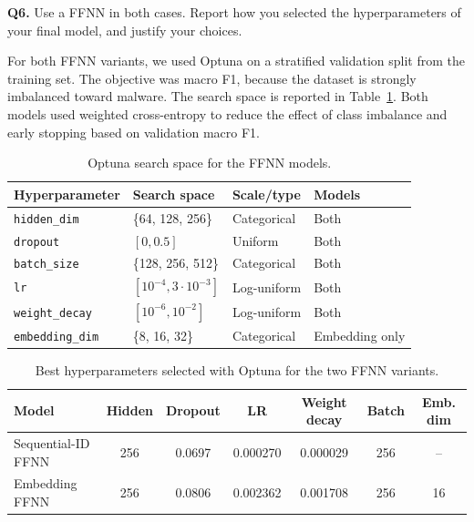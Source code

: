 \begin{questionbox}
\textbf{Q6.} Use a FFNN in both cases. Report how you selected the hyperparameters of your final
model, and justify your choices.
\end{questionbox}

For both FFNN variants, we used Optuna on a stratified validation split from the training set. The
objective was macro F1, because the dataset is strongly imbalanced toward malware. The search space
is reported in Table~\ref{tab:task2_optuna_space}. Both models used weighted cross-entropy to reduce
the effect of class imbalance and early stopping based on validation macro F1.

\begin{table}[h!]
\centering
\begin{tabular}{llll}
\hline
\textbf{Hyperparameter} & \textbf{Search space} & \textbf{Scale/type} & \textbf{Models} \\
\hline
\texttt{hidden\_dim} & \{64, 128, 256\} & Categorical & Both \\
\texttt{dropout} & $[0, 0.5]$ & Uniform & Both \\
\texttt{batch\_size} & \{128, 256, 512\} & Categorical & Both \\
\texttt{lr} & $[10^{-4}, 3 \cdot 10^{-3}]$ & Log-uniform & Both \\
\texttt{weight\_decay} & $[10^{-6}, 10^{-2}]$ & Log-uniform & Both \\
\texttt{embedding\_dim} & \{8, 16, 32\} & Categorical & Embedding only \\
\hline
\end{tabular}
\caption{Optuna search space for the FFNN models.}
\label{tab:task2_optuna_space}
\end{table}

\begin{table}[h!]
\centering
\begin{tabular}{lcccccc}
\hline
\textbf{Model} & \textbf{Hidden} & \textbf{Dropout} & \textbf{LR} & \textbf{Weight decay} &
\textbf{Batch} & \textbf{Emb. dim} \\
\hline
Sequential-ID FFNN & 256 & 0.0697 & 0.000270 & 0.000029 & 256 & -- \\
Embedding FFNN     & 256 & 0.0806 & 0.002362 & 0.001708 & 256 & 16 \\
\hline
\end{tabular}
\caption{Best hyperparameters selected with Optuna for the two FFNN variants.}
\label{tab:task2_hyperparameters}
\end{table}

